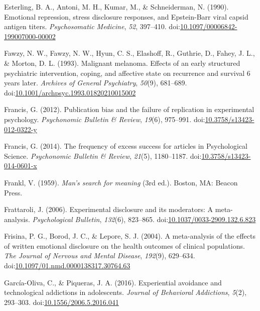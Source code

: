 \documentclass[man, mask]{apa6}
\theoremstyle{definition}
\theoremstyle{definition}
\theoremstyle{definition}
\theoremstyle{remark}
\begin{document}
\hypertarget{ref-Esterling1990}{}
Esterling, B. A., Antoni, M. H., Kumar, M., \& Schneiderman, N. (1990).
Emotional repression, stress disclosure responses, and Epstein-Barr
viral capsid antigen titers. \emph{Psychosomatic Medicine}, \emph{52},
397--410.
doi:\href{https://doi.org/10.1097/00006842-199007000-00002}{10.1097/00006842-199007000-00002}

\hypertarget{ref-Fawzy1993}{}
Fawzy, N. W., Fawzy, N. W., Hyun, C. S., Elashoff, R., Guthrie, D.,
Fahey, J. L., \& Morton, D. L. (1993). Malignant melanoma. Effects of an
early structured psychiatric intervention, coping, and affective state
on recurrence and survival 6 years later. \emph{Archives of General
Psychiatry}, \emph{50}(9), 681--689.
doi:\href{https://doi.org/10.1001/archpsyc.1993.01820210015002}{10.1001/archpsyc.1993.01820210015002}

\hypertarget{ref-Francis2012}{}
Francis, G. (2012). Publication bias and the failure of replication in
experimental psychology. \emph{Psychonomic Bulletin \& Review},
\emph{19}(6), 975--991.
doi:\href{https://doi.org/10.3758/s13423-012-0322-y}{10.3758/s13423-012-0322-y}

\hypertarget{ref-Francis2014}{}
Francis, G. (2014). The frequency of excess success for articles in
Psychological Science. \emph{Psychonomic Bulletin \& Review},
\emph{21}(5), 1180--1187.
doi:\href{https://doi.org/10.3758/s13423-014-0601-x}{10.3758/s13423-014-0601-x}

\hypertarget{ref-Frankl1959}{}
Frankl, V. (1959). \emph{Man's search for meaning} (3rd ed.). Boston,
MA: Beacon Press.

\hypertarget{ref-Frattaroli2006}{}
Frattaroli, J. (2006). Experimental disclosure and its moderators: A
meta-analysis. \emph{Psychological Bulletin}, \emph{132}(6), 823--865.
doi:\href{https://doi.org/10.1037/0033-2909.132.6.823}{10.1037/0033-2909.132.6.823}

\hypertarget{ref-Frisina2004a}{}
Frisina, P. G., Borod, J. C., \& Lepore, S. J. (2004). A meta-analysis
of the effects of written emotional disclosure on the health outcomes of
clinical populations. \emph{The Journal of Nervous and Mental Disease},
\emph{192}(9), 629--634.
doi:\href{https://doi.org/10.1097/01.nmd.0000138317.30764.63}{10.1097/01.nmd.0000138317.30764.63}

\hypertarget{ref-Garcia-Oliva2016}{}
García-Oliva, C., \& Piqueras, J. A. (2016). Experiential avoidance and
technological addictions in adolescents. \emph{Journal of Behavioral
Addictions}, \emph{5}(2), 293--303.
doi:\href{https://doi.org/10.1556/2006.5.2016.041}{10.1556/2006.5.2016.041}
\end{document}

